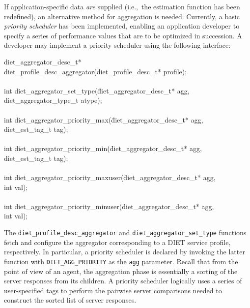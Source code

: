 If application-specific data \emph{are} supplied (i.e.,~the
estimation function has been redefined), an alternative method for
aggregation is needed.  Currently, a basic
\emph{priority scheduler} has been implemented, enabling an
application developer to specify a series of performance values that
are to be optimized in succession.  A developer may implement a
priority scheduler using the following interface:
\begin{code}
\begin{tabbing}
diet\_aggregator\_desc\_t* \\
diet\_profile\_desc\_aggregator(diet\_profile\_desc\_t* profile); \\
\\
int diet\_aggregator\_set\_type(\=diet\_aggregator\_desc\_t* agg, \\
\> diet\_aggregator\_type\_t atype); \\
\\
int diet\_aggregator\_priority\_max(\=diet\_aggregator\_desc\_t* agg, \\
\> diet\_est\_tag\_t tag); \\
\\
int diet\_aggregator\_priority\_min(\=diet\_aggregator\_desc\_t* agg, \\
\> diet\_est\_tag\_t tag); \\
\\
int diet\_aggregator\_priority\_maxuser(\=diet\_aggregator\_desc\_t* agg, \\
\> int val); \\
\\
int diet\_aggregator\_priority\_minuser(\=diet\_aggregator\_desc\_t* agg, \\
\> int val); \\
\end{tabbing}
\end{code}
The \texttt{diet\_profile\_desc\_aggregator} and
\texttt{diet\_aggregator\_set\_type} functions fetch and configure the
aggregator corresponding to a DIET service profile, respectively.
In particular, a priority scheduler is declared by invoking the latter
function with \texttt{DIET\_AGG\_PRIORITY} as the \texttt{agg}
parameter.
Recall that from the point of view of an agent, the aggregation phase
is essentially a sorting of the server responses from its children.
A priority scheduler logically uses a series of user-specified tags to
perform the pairwise server comparisons needed to construct the 
sorted list of server responses.


